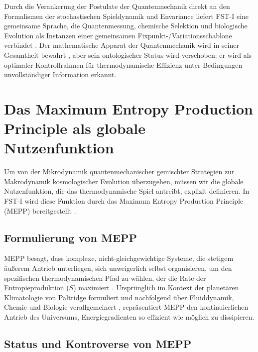 \documentclass[12pt,a4paper]{article}
\theoremstyle{remark}
\begin{document}
Durch die Verankerung der Postulate der Quantenmechanik direkt an den Formalismen der stochastischen Spieldynamik und Envariance liefert FST-I eine gemeinsame Sprache, die Quantenmessung, chemische Selektion und biologische Evolution als Instanzen einer gemeinsamen Fixpunkt-/Variationsschablone verbindet \citep{ZurekDerivation2003}. Der mathematische Apparat der Quantenmechanik wird in seiner Gesamtheit bewahrt \citep{QuantumOptimization}, aber sein ontologischer Status wird verschoben: er wird als optimaler Kontrollrahmen f\"ur thermodynamische Effizienz unter Bedingungen unvollst\"andiger Information erkannt.

\section{Das Maximum Entropy Production Principle als globale Nutzenfunktion}
\label{sec:mepp}

Um von der Mikrodynamik quantenmechanischer gemischter Strategien zur Makrodynamik kosmologischer Evolution \"uberzugehen, m\"ussen wir die globale Nutzenfunktion, die das thermodynamische Spiel antreibt, explizit definieren. In FST-I wird diese Funktion durch das Maximum Entropy Production Principle (MEPP) bereitgestellt \citep{MEPP2004}.

\subsection{Formulierung von MEPP}

MEPP besagt, dass komplexe, nicht-gleichgewichtige Systeme, die stetigem \"au\ss{}erem Antrieb unterliegen, sich unweigerlich selbst organisieren, um den spezifischen thermodynamischen Pfad zu w\"ahlen, der die Rate der Entropieproduktion ($\dot{S}$) maximiert \citep{MEPPFoundations}. Urspr\"unglich im Kontext der planet\"aren Klimatologie von Paltridge \citep{Paltridge1975} formuliert und nachfolgend \"uber Fluiddynamik, Chemie und Biologie verallgemeinert \citep{MEPP2004}, repr\"asentiert MEPP den kontinuierlichen Antrieb des Universums, Energiegradienten so effizient wie m\"oglich zu dissipieren.

\subsection{Status und Kontroverse von MEPP}
\end{document}
